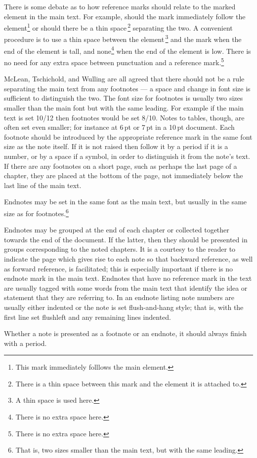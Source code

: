 \documentclass[10pt,a4paper,oneside,extrafontsizes]{memoir}%
\newcommand\U[2]{\textrm{#1}\,\textrm{#2}}
\begin{document}
\begin{paracol}{2}
    There is some debate as to how reference marks should relate to the 
marked element in the main text. For example, should the mark immediately 
follow the element\footnote{This mark immediately folllows the main element.} 
or should there be a thin space\,\footnote{There is a thin space between this
mark and the element it is attached to.} separating the two. A convenient 
procedure is to use a thin space between the 
element\,\footnote{A thin space is used here.} and the mark when the end of 
the element is tall, and 
none\footnote{There is no extra space here.} when the end of the element is 
low. There is no need for any extra space between punctuation and a reference
mark.\footnote{There is no extra space here.}

    McLean, Tschichold, and Wulling are all agreed that there should not be
a rule separating the main text from any footnotes --- a space and change in
font size is sufficient to distinguish the two. The font size for 
footnotes
is usually two sizes smaller than the main font but with the same 
leading. For example if the main text is set 10/12 then 
footnotes would be set 8/10. Notes to tables, though, are often set even 
smaller; for instance at \U{6}{pt} or \U{7}{pt} in a \U{10}{pt} document. 
Each footnote should be introduced by the 
appropriate reference mark in the same font size as the note itself. If it is 
not raised then follow it by a period if it is a number, or by a space 
if a symbol, in order to distinguish it from the note's text. 
If there are any footnotes on a
short page, such as perhaps the last page of a chapter, they are placed
at the bottom of the page, not immediately below the last line of the main 
text.

   Endnotes may be set in the same font as the main text, but usually in
the same size as for footnotes.\footnote{That is, two
sizes smaller than the main text, but with the same leading.} 

   Endnotes may be grouped at the end of each chapter or collected together
towards the end of the document. If the latter, then they should be presented
in groups corresponding to the noted chapters. It is a courtesy to the reader
to indicate the page which gives rise to each note so that backward reference,
as well as forward reference, is facilitated; this is especially important
if there is no endnote mark in the main text. Endnotes
that have no reference mark in the text are usually
tagged with some words from the main text that identify the idea or statement
that they are referring to.
   In an endnote listing note numbers are usually either indented or the note
is set flush-and-hang style; that is, with the 
first line set flushleft and any remaining lines indented.

Whether a note
is presented as a footnote or an endnote, it should always finish with a
period.
\end{paracol}
\end{document}
